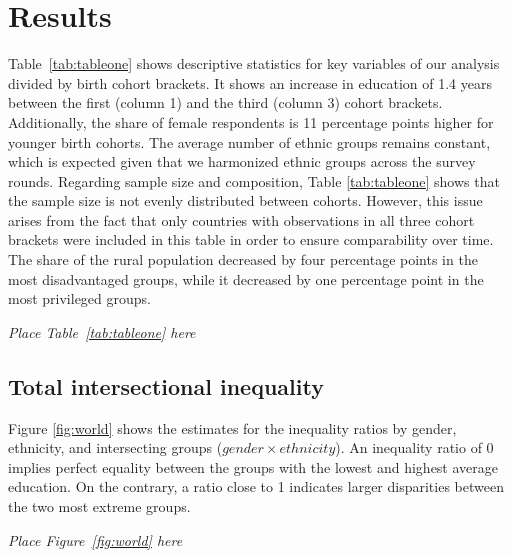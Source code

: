\hypertarget{results}{%
\section{Results}\label{results}}

Table~\ref{tab:tableone} shows descriptive statistics for key variables of our analysis divided by birth cohort brackets. It shows an increase in education of 1.4 years between the first (column 1) and the third (column 3) cohort brackets. Additionally, the share of female respondents is 11 percentage points higher for younger birth cohorts. The average number of ethnic groups remains constant, which is expected given that we harmonized ethnic groups across the survey rounds. Regarding sample size and composition, Table \ref{tab:tableone} shows that the sample size is not evenly distributed between cohorts. However, this issue arises from the fact that only countries with observations in all three cohort brackets were included in this table in order to ensure comparability over time. The share of the rural population decreased by four percentage points in the most disadvantaged groups, while it decreased by one percentage point in the most privileged groups.

\begin{center}
    \textit{Place Table~\ref{tab:tableone} here}
\end{center}

\hypertarget{intersectional-inequality}{%
\subsection{Total intersectional inequality}\label{intersectional-inequality}}

Figure \ref{fig:world} shows the estimates for the inequality ratios by gender, ethnicity, and intersecting groups ($gender \times ethnicity$). An inequality ratio of 0 implies perfect equality between the groups with the lowest and highest average education. On the contrary, a ratio close to 1 indicates larger disparities between the two most extreme groups.

\begin{center}
    \textit{Place Figure~\ref{fig:world} here}
\end{center}

